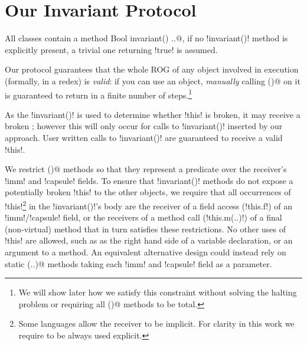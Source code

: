 \section{Our Invariant Protocol}
\label{s:protocol}
All classes contain a \Q@read method Bool invariant() {..}@, if no \Q!invariant()! method is explicitly present, a trivial one returning \Q!true! is assumed.

Our protocol guarantees that the whole ROG of any object involved in execution (formally, in a redex) is \emph{valid}: if you can use an object, \emph{manually} calling \Q@invariant()@ on it is guaranteed to return \Q@true@ in a finite number of steps.\footnote{
  We will show later how we satisfy this constraint without 
  solving the halting problem or requiring all \Q@invariant()@ methods to be total.
  }

As the \Q!invariant()! is used to determine whether \Q!this! is broken, it may receive a broken \Q@this@; however this will only occur for calls to \Q!invariant()! inserted by our approach. User written calls to \Q!invariant()! are guaranteed to receive a valid \Q!this!.

We restrict \Q@invariant()@ methods so that they represent a predicate over the receiver's \Q!imm! and \Q!capsule! fields. To ensure that \Q!invariant()! methods do not expose a potentially broken \Q!this! to the other objects, we require that all occurrences of \Q!this!\footnote{Some languages allow the \Q@this@ receiver to be implicit. For clarity in this work we require \Q@this@ to be always used explicit.} 
in the \Q!invariant()!'s body are the receiver of a field access (\Q!this.f!) of an \Q!imm!/\Q!capsule! field, or the receivers of a method call (\Q!this.m(..)!) of a final (non-virtual) method that in turn satisfies these restrictions. No other uses of \Q!this! are allowed, such as as the right hand side of a variable declaration, or an argument to a method.
An equivalent alternative design could instead rely on static \Q@invariant(..)@ methods taking each \Q!imm! and \Q!capsule! field as a parameter.


